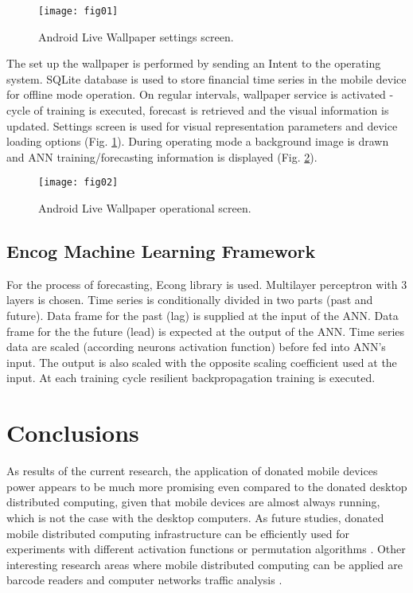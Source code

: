 \documentclass{llncs}
\begin{document}
\begin{figure}[h]
  \centering
  \texttt{[image: fig01]}
  \caption{Android Live Wallpaper settings screen.}
\label{fig:01}
\end{figure}

The set up the wallpaper is performed by sending an Intent to the operating system. SQLite database is used to store financial time series in the mobile device for offline mode operation. On regular intervals, wallpaper service is activated - cycle of training is executed, forecast is retrieved and the visual information is updated. Settings screen is used for visual representation parameters and device loading options (Fig. \ref{fig:01}). During operating mode a background image is drawn and ANN training/forecasting information is displayed (Fig. \ref{fig:02}). 

\begin{figure}[h]
  \centering
  \texttt{[image: fig02]}
  \caption{Android Live Wallpaper operational screen.}
\label{fig:02}
\end{figure}

\subsection{Encog Machine Learning Framework}

For the process of forecasting, Econg library is used. Multilayer perceptron with 3 layers is chosen. Time series is conditionally divided in two parts (past and future). Data frame for the past (lag) is supplied at the input of the ANN. Data frame for the the future (lead) is expected at the output of the ANN. Time series data are scaled (according neurons activation function) before fed into ANN's input. The output is also scaled with the opposite scaling coefficient used at the input. At each training cycle resilient backpropagation training is executed. 

\section{Conclusions}

As results of the current research, the application of donated mobile devices power appears to be much more promising even compared to the donated desktop distributed computing, given that mobile devices are almost always running, which is not the case with the desktop computers. As future studies, donated mobile distributed computing infrastructure can be efficiently used for experiments with different activation functions \cite{zankinski01} or permutation algorithms \cite{zankinski02}. Other interesting research areas where mobile distributed computing can be applied are barcode readers \cite{atanasova02} and computer networks traffic analysis \cite{tashev01,tashev02}.
\end{document}

